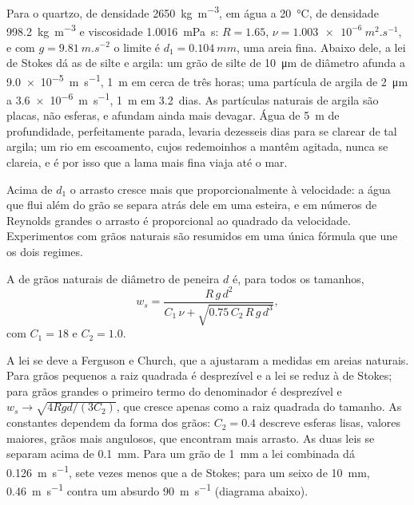 Para o quartzo, de densidade \qty{2650}{kg.m^{-3}}, em água a \qty{20}{\celsius},
de densidade \qty{998.2}{kg.m^{-3}} e viscosidade \qty{1.0016}{mPa.s}: $R =
1.65$, $\nu = \qty{1.003e-6}{m^2.s^{-1}}$, e com $g =
\qty{9.81}{m.s^{-2}}$ o limite é $d_1 = \qty{0.104}{mm}$, uma areia fina. Abaixo dele, a lei de Stokes dá as  de silte e argila: um grão de silte de \qty{10}{\micro m} de diâmetro afunda a \qty{9.0e-5}{m.s^{-1}}, \qty{1}{m} em cerca de três horas; uma partícula de argila de \qty{2}{\micro m} a \qty{3.6e-6}{m.s^{-1}}, \qty{1}{m} em \num{3.2}~dias. As partículas naturais de argila são
placas, não esferas, e afundam ainda mais devagar. Água de \qty{5}{m} de profundidade, perfeitamente parada, levaria dezesseis dias para se clarear de tal argila; um rio em escoamento, cujos redemoinhos a mantêm agitada, nunca se clareia, e é por isso que a lama mais fina viaja até o mar.

Acima de $d_1$ o arrasto cresce mais que proporcionalmente à velocidade: a água que flui além do grão se separa atrás dele em uma esteira, e em números de Reynolds grandes o arrasto é proporcional ao quadrado da velocidade. Experimentos com grãos naturais são resumidos em uma única fórmula que une os dois regimes.

\begin{proposition}\label{prop:b1:erosion-transport:combined}
A  de grãos naturais de diâmetro de peneira $d$ é, para todos os tamanhos,
\[
  w_s = \frac{R\,g\,d^2}{C_1\,\nu + \sqrt{0.75\,C_2\,R\,g\,d^3}},
\]
com $C_1 = 18$ e $C_2 = 1.0$.
\end{proposition}
\admitted

A lei se deve a Ferguson e Church, que a ajustaram a  medidas em areias naturais. Para grãos pequenos a raiz quadrada é desprezível e a lei se reduz à de Stokes; para grãos grandes o primeiro termo do denominador é desprezível e $w_s \to \sqrt{4 R g d/(3 C_2)}$, que cresce apenas como a raiz quadrada do tamanho. As constantes dependem da forma dos grãos: $C_2 = 0.4$ descreve esferas lisas, valores maiores, grãos mais angulosos, que encontram mais arrasto. As duas leis se separam acima de \qty{0.1}{mm}. Para um grão de \qty{1}{mm} a lei combinada dá \qty{0.126}{m.s^{-1}}, sete vezes menos que a de Stokes; para um seixo de \qty{10}{mm}, \qty{0.46}{m.s^{-1}} contra um absurdo \qty{90}{m.s^{-1}} (diagrama abaixo).

